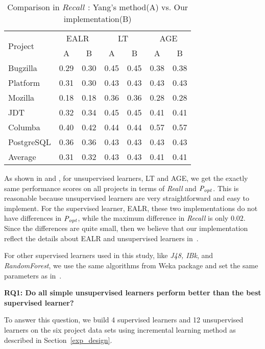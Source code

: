 \begin{table}[]
    \centering
    \caption{Comparison in $Recall$ : Yang's method(A) vs. Our implementation(B)}
    \begin{tabular}{l|c c| c c| c c}
    \hline
        \multirow{2}{*}{Project} &
        \multicolumn{2}{c|}{EALR} &
        \multicolumn{2}{c|}{LT} &\multicolumn{2}{c}{AGE} \\
        \cline{2-7}
        &A & B& A&B&A&B \\
        \hline
        Bugzilla & 0.29 & 0.30 &0.45 &  0.45& 0.38  & 0.38 \\
        Platform & 0.31 & 0.30 & 0.43 & 0.43 & 0.43 & 0.43\\
        Mozilla & 0.18 &0.18 &0.36 &0.36 &0.28&0.28\\
        JDT & 0.32 & 0.34& 0.45 &0.45 & 0.41  & 0.41\\
        Columba & 0.40 & 0.42& 0.44 & 0.44 & 0.57  & 0.57 \\
        PostgreSQL & 0.36 &0.36&0.43&0.43&0.43 &0.43\\ \hline
        Average & 0.31 & 0.32 & 0.43 & 0.43 & 0.41 & 0.41 \\ \hline
    \end{tabular}
    \label{tab:comp_Recall}
\end{table}


As shown in  and , for unsupervised learners,
LT and AGE, we get the exactly same performance scores on all projects in terms
of {\it Reall} and ${\it P_{opt}}$. This is reasonable because unsupervised learners
are very straightforward and easy to implement. For the supervised learner, EALR, 
these two implementations do not have differences in ${\it P_{opt}}$, while the maximum
difference in  {\it Recall} is only ${0.02}$. Since the differences are quite small,
then we believe that our implementation reflect the details about EALR and unsupervised
learners in~\cite{yang2016effort}. 

For other supervised learners used in this study, like {\it J48, IBk}, and {
\it RandomForest}, we use the same algorithms from Weka package and set the same parameters as in~\cite{yang2016effort}.

\textbf{RQ1: Do all simple unsupervised learners perform better than the best supervised learner?}


To answer this question, we build 4 supervised learners and 12
unsupervised learners on the six project data sets using incremental learning
method as described in Section~\ref{exp_design}. 


